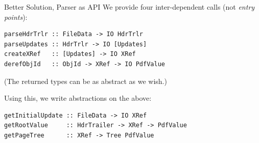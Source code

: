 \documentclass[t,10pt,xcolor={dvipsnames}]{beamer}
\begin{document}
\begin{frame}[label={sec:org5c3c2e5},fragile]{Better Solution, Parser as API}
 We provide four inter-dependent calls (not \emph{entry points}):
\lstset{language=haskell,label= ,caption= ,captionpos=b,numbers=none}
\begin{lstlisting}
parseHdrTrlr :: FileData -> IO HdrTrlr
parseUpdates :: HdrTrlr -> IO [Updates]
createXRef   :: [Updates] -> IO XRef
derefObjId   :: ObjId -> XRef -> IO PdfValue
\end{lstlisting}
(The returned types can be as abstract as we wish.)

\vspace{18pt}

Using this, we write abstractions on the above:
\lstset{language=haskell,label= ,caption= ,captionpos=b,numbers=none}
\begin{lstlisting}
getInitialUpdate :: FileData -> IO XRef
getRootValue     :: HdrTrailer -> XRef -> PdfValue
getPageTree      :: XRef -> Tree PdfValue
\end{lstlisting}
\end{frame}
\end{document}
